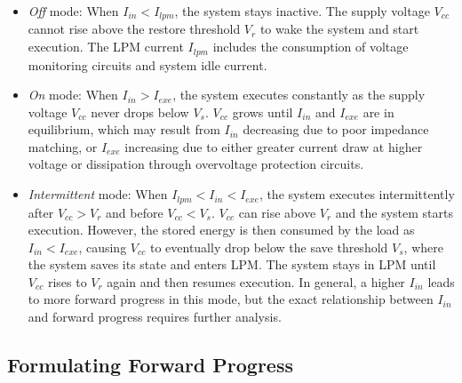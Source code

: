 \begin{itemize}
	\item \textit{Off} mode: When $I_{in} < I_{lpm}$, the system stays inactive. The supply voltage $V_{cc}$ cannot rise above the restore threshold $V_{r}$ to wake the system and start execution. The LPM current $I_{lpm}$ includes the consumption of voltage monitoring circuits and system idle current.

    \item \textit{On} mode: When $I_{in} > I_{exe}$, the system executes constantly as the supply voltage $V_{cc}$ never drops below $V_{s}$. $V_{cc}$ grows until $I_{in}$ and $I_{exe}$ are in equilibrium, which may result from $I_{in}$ decreasing due to poor impedance matching, or $I_{exe}$ increasing due to either greater current draw at higher voltage or dissipation through overvoltage protection circuits. 

	\item \textit{Intermittent} mode: When $I_{lpm} < I_{in} < I_{exe}$, the system executes intermittently after $V_{cc} > V_{r}$ and before $V_{cc} < V_{s}$. $V_{cc}$ can rise above $V_{r}$ and the system starts execution. However, the stored energy is then consumed by the load as $I_{in} < I_{exe}$, causing $V_{cc}$ to eventually drop below the save threshold $V_{s}$, where the system saves its state and enters LPM. The system stays in LPM until $V_{cc}$ rises to $V_{r}$ again and then resumes execution. 
    In general, a higher $I_{in}$ leads to more forward progress in this mode, but the exact relationship between $I_{in}$ and forward progress requires further analysis.
    
\end{itemize}

\subsection{Formulating Forward Progress} \label{subsec:formulation}

